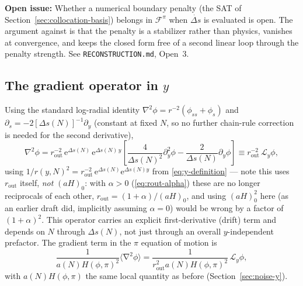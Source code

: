 \documentclass[a4paper,11pt]{article}
\newcommand{\e}[1]{\mathrm{e}^{{#1}}}
\DeclareMathOperator{\grad}{\nabla}
\newenvironment{todo}{\begin{tcolorbox}[enhanced,breakable,colback=SussexBurntOrange!10,colframe=SussexBurntOrange!40]\small{\textsf{\textbf{Open issue:} }}}{\end{tcolorbox}}
\newcommand{\Ny}{N}                          %
\newcommand{\Hub}{H}                         %
\newcommand{\sfactor}{a}                     %
\newcommand{\atloc}{(\field,\mom)}           %
\newcommand{\field}{\phi}                    %
\newcommand{\mom}{\pi}                       %
\newcommand{\rad}{r}                         %
\newcommand{\yco}{y}                         %
\newcommand{\rout}{\rad_{\mathrm{out}}}      %
\newcommand{\aHo}{(\sfactor \Hub)_0}         %
\newcommand{\aHloc}{\sfactor(\Ny)\Hub\atloc} %
\newcommand{\Deltas}{\Delta s}                %
\newcommand{\Lop}{\mathcal{L}_\yco}          %
\newcommand{\Fcore}{\mathcal{F}}              %
\begin{document}
\begin{todo}
Whether a numerical boundary penalty (the SAT of
Section~\ref{sec:collocation-basis}) belongs in $\Fcore^{\mom}$ when
$\dot{\Deltas}$ is evaluated is open. The argument against is that the
penalty is a stabilizer rather than physics, vanishes at convergence, and
keeps the closed form free of a second linear loop through the penalty
strength. See \texttt{RECONSTRUCTION.md}, Open~3.
\end{todo}

\subsection{The gradient operator in $\yco$}
\label{sec:gradient-operator}

Using the standard log-radial identity $\nabla^2\field = \rad^{-2}(\field_{ss}+\field_s)$
and $\partial_s = -2 [ \Deltas(\Ny) ]^{-1} \partial_\yco$ (constant at fixed
$\Ny$, so no further chain-rule correction is needed for the second
derivative),
\begin{equation}
    \nabla^2\field
    =
    \rout^{-2}\,\e{\Deltas(\Ny)}\,\e{\Deltas(\Ny)\,\yco}
    \left[\frac{4}{\Deltas(\Ny)^2}\partial_\yco^2\field - \frac{2}{\Deltas(\Ny)}\partial_\yco\field\right]
    \equiv
    \rout^{-2}\,\Lop\field ,
    \label{eq:Lop-definition}
\end{equation}
using $1/\rad(\yco,\Ny)^2 = \rout^{-2}\,\e{\Deltas(\Ny)}\e{\Deltas(\Ny)\yco}$
from \eqref{eq:y-definition} --- note this uses $\rout$ itself, \emph{not}
$\aHo$: with $\alpha>0$ (\eqref{eq:rout-alpha}) these are no longer reciprocals of each
other, $\rout=(1+\alpha)/\aHo$, and using $\aHo^2$ here (as an earlier
draft did, implicitly assuming $\alpha=0$) would be wrong by a factor of
$(1+\alpha)^2$. This operator
carries an explicit first-derivative (drift) term and depends on $\Ny$
through $\Deltas(\Ny)$, not just through an overall $\yco$-independent
prefactor. The gradient term in the $\mom$ equation of motion is
\begin{equation}
    \frac{1}{\aHloc^2}\big\langle\grad^2\field\big\rangle
    =
    \frac{1}{\rout^2\aHloc^2}\,\Lop\field ,
    \label{eq:gradient-term-y}
\end{equation}
with $\aHloc$ the same local quantity as before (Section~\ref{sec:noise-y}).
\end{document}
